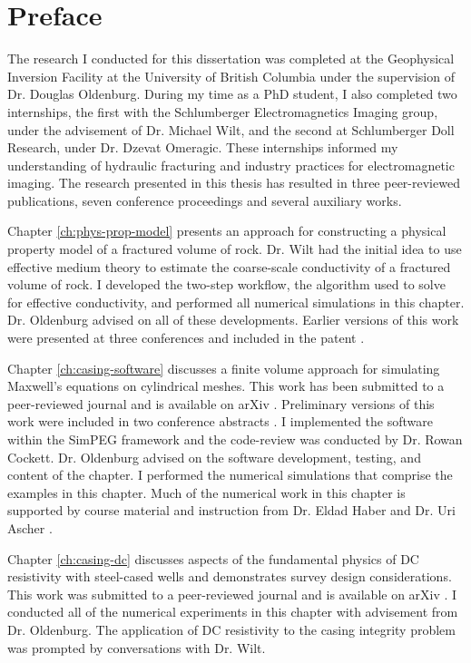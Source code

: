 
\chapter{Preface}

The research I conducted for this dissertation was completed at the Geophysical Inversion Facility at the University of British Columbia under the supervision of Dr. Douglas Oldenburg. During my time as a PhD student, I also completed two internships, the first with the Schlumberger Electromagnetics Imaging group, under the advisement of Dr. Michael Wilt, and the second at Schlumberger Doll Research, under Dr. Dzevat Omeragic. These internships informed my understanding of hydraulic fracturing and industry practices for electromagnetic imaging. The research presented in this thesis has resulted in three peer-reviewed publications, seven conference proceedings and several auxiliary works.

Chapter \ref{ch:phys-prop-model} presents an approach for constructing a physical property
model of a fractured volume of rock. Dr. Wilt had the initial idea to use effective medium theory to estimate the coarse-scale conductivity of a fractured volume of rock. I developed the two-step workflow, the algorithm used to solve for effective conductivity, and performed all numerical simulations in this chapter. Dr. Oldenburg advised on all of these developments. Earlier versions of this work were presented at three conferences \citep{Heagy2013, Heagy2014, Wilt2014} and included in the patent \cite{Wilt2015}.

Chapter \ref{ch:casing-software} discusses a finite volume approach for simulating Maxwell’s equations on cylindrical meshes. This work has been submitted to a peer-reviewed journal and is available on arXiv \citep{Heagy2018a}. Preliminary versions of this work were included in two conference abstracts \citep{Heagy2015, Heagy2017a}. I implemented the software within the SimPEG framework and the code-review was conducted by Dr. Rowan Cockett. Dr. Oldenburg advised on the software development, testing, and content of the chapter. I performed the numerical simulations that comprise the examples in this chapter. Much of the numerical work in this chapter is supported by course material and instruction from Dr. Eldad Haber and Dr. Uri Ascher \citep{Haber2014a, Ascher2008}.

Chapter \ref{ch:casing-dc} discusses aspects of the fundamental physics of DC resistivity with steel-cased wells and demonstrates survey design considerations. This work was submitted to a peer-reviewed journal and is available on arXiv \citep{Heagy2018c}. I conducted all of the numerical experiments in this chapter with advisement from Dr. Oldenburg. The application of DC resistivity to the casing integrity problem was prompted by conversations with Dr. Wilt.

